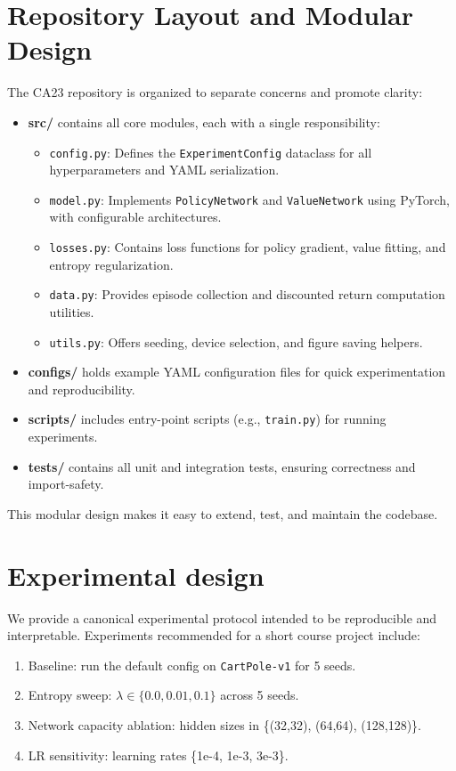 \documentclass[11pt]{article}
\begin{document}
\section{Repository Layout and Modular Design}
The CA23 repository is organized to separate concerns and promote clarity:
\begin{itemize}
  \item \textbf{src/} contains all core modules, each with a single responsibility:
    \begin{itemize}
      \item \texttt{config.py}: Defines the \texttt{ExperimentConfig} dataclass for all hyperparameters and YAML serialization.
      \item \texttt{model.py}: Implements \texttt{PolicyNetwork} and \texttt{ValueNetwork} using PyTorch, with configurable architectures.
      \item \texttt{losses.py}: Contains loss functions for policy gradient, value fitting, and entropy regularization.
      \item \texttt{data.py}: Provides episode collection and discounted return computation utilities.
      \item \texttt{utils.py}: Offers seeding, device selection, and figure saving helpers.
    \end{itemize}
  \item \textbf{configs/} holds example YAML configuration files for quick experimentation and reproducibility.
  \item \textbf{scripts/} includes entry-point scripts (e.g., \texttt{train.py}) for running experiments.
  \item \textbf{tests/} contains all unit and integration tests, ensuring correctness and import-safety.
\end{itemize}
This modular design makes it easy to extend, test, and maintain the codebase.

\section{Experimental design}
We provide a canonical experimental protocol intended to be reproducible and
interpretable. Experiments recommended for a short course project include:

\begin{enumerate}[itemsep=2pt]
\item Baseline: run the default config on \texttt{CartPole-v1} for 5 seeds.
\item Entropy sweep: \(\lambda \in \{0.0, 0.01, 0.1\}\) across 5 seeds.
\item Network capacity ablation: hidden sizes in \{(32,32), (64,64), (128,128)\}.
\item LR sensitivity: learning rates \{1e-4, 1e-3, 3e-3\}.
\end{enumerate}
\end{document}
